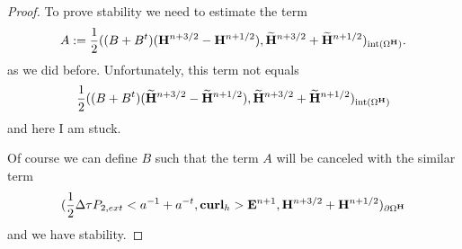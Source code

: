 \documentclass[12pt,reqno]{amsart}
\newcommand{\curl}{{\bf curl}}
\newcommand{\acurl}{\langle a^{-1},{\bf curl_h}\rangle}
\newcommand{\e}{{\bf E}}
\newcommand{\h}{{\bf H}}
\newtheorem{cor}[theorem]{Corollary}
\newtheorem{rem}[theorem]{Remark}
\theoremstyle{definition}
\numberwithin{equation}{section}
\newcommand{\intr}[1]{\mathrm{int}(#1)}
\def\Gw{\Omega}     \def\Gx{\Xi}         \def\Gy{\Psi}
\begin{document}
\begin{proof}
To prove stability we need to  estimate  the term 
$$
A:=
\frac{1}{2}((B+B^t)(\h^{n+3/2}-\h^{n+1/2}),\widetilde{\h}^{n+3/2}+\widetilde{\h}^{n+1/2})_{\intr{\Gw^\h}}.
$$
as we did before.
Unfortunately, 
this term not equals 
$$
\frac{1}{2}((B+B^t)(\widetilde{\h}^{n+3/2}-\widetilde{\h}^{n+1/2}),\widetilde{\h}^{n+3/2}+\widetilde{\h}^{n+1/2})_{\intr{\Gw^\h}}
$$
and here I am stuck.
	
Of course we can define 
$B$ such that the term $A$ will be canceled with the similar term
$$
(\frac{1}{2}\Delta \tau P_{2,ext}<a^{-1}+a^{-t},\curl_h>\e^{n+1},\h^{n+3/2}+\h^{n+1/2})_{\partial{\Gw^\h}}
$$	
and we have stability.
	

\end{proof}


\end{document}
